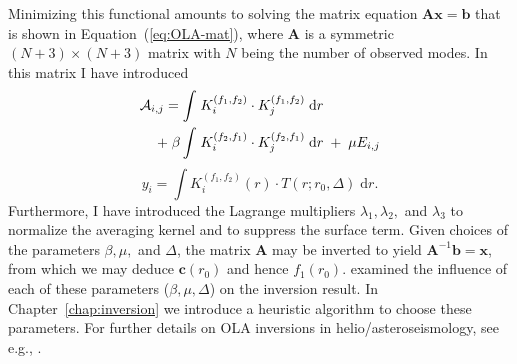 Minimizing this functional amounts to solving the matrix equation ${\mathbf{A}\mathbf{x} = \mathbf{b}}$ that is shown in Equation~(\ref{eq:OLA-mat}), where $\mathbf{A}$ is a symmetric ${(N+3)\times (N+3)}$ matrix with $N$ being the number of observed modes. %
In this matrix I have introduced
\begin{align}
    \mathcal{A}_{i,j} 
    = 
    \int &\; K_i^{(f_1, f_2)} \cdot K_j^{(f_1, f_2)} %
    \; \text{d}r 
    \notag\\\;+\;\beta \int &\; K_i^{(f_2, f_1)} \cdot K_j^{(f_2, f_1)} \; \text{d}r 
    \; + \; \mu E_{i,j}
\end{align}
\begin{equation}
        y_i%
        = 
        \int K_i^{(f_1, f_2)}(r) \cdot T(r; r_0, \Delta) \; \text{d}r. 
\end{equation}
Furthermore, I have introduced the Lagrange multipliers $\lambda_1, \lambda_2,$ and $\lambda_3$ to normalize the averaging kernel and to suppress the surface term. 
Given choices of the parameters $\beta, \mu,$ and $\Delta$, the matrix $\mathbf{A}$ may be inverted %
to yield ${\mathbf{A}^{-1}\mathbf{b}=\mathbf{x}}$, from which we may deduce ${\mathbf c(r_0)}$ and hence ${f_1(r_0)}$. 
\citet{1998esasp.418..505r,1999MNRAS.309...35R} examined the influence of each of these parameters ($\beta, \mu, \Delta$) on the inversion result. 
In Chapter~\ref{chap:inversion} we introduce a heuristic algorithm to choose these parameters. 
For further details on OLA inversions in helio/asteroseismology, see e.g., \citet{basuchaplin2017}. 


